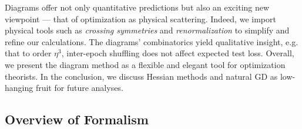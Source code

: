 \documentclass{article}
\theoremstyle{plain}
\theoremstyle{definition}
\begin{document}


        Diagrams offer not only quantitative predictions but also an exciting
        new viewpoint --- that of optimization as physical scattering.  Indeed,
        we import physical tools such as \emph{crossing symmetries}
        \citep{dy49b} and \emph{renormalization} \citep{ge54} to simplify and
        refine our calculations.  The diagrams' combinatorics yield qualitative
        insight, e.g. that to order $\eta^3$, inter-epoch shuffling does not
        affect expected test loss.
        Overall, we present the diagram method as a
        flexible and elegant tool for optimization theorists.  In the
        conclusion, we discuss Hessian methods and natural GD as low-hanging
        fruit for future analyses.

    \subsection{Overview of Formalism}

\end{document}
